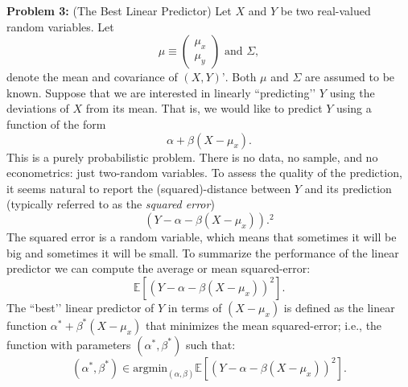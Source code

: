\documentclass[11pt]{article} %
\begin{document}
\noindent \textbf{Problem 3:} (The Best Linear Predictor) Let $X$ and $Y$ be two real-valued random variables. Let
\[\mu \equiv \begin{pmatrix} \mu_x \\ \mu_y \end{pmatrix} \textrm{ and } \Sigma, \]
denote the mean and covariance of $(X,Y)’$. Both $\mu$ and $\Sigma$ are assumed to be known. Suppose that we are interested in linearly ``predicting’’ $Y$ using the deviations of $X$ from its mean. That is, we would like to predict $Y$ using a function of the form
\[ \alpha + \beta (X-\mu_x). \]
This is a purely probabilistic problem. There is no data, no sample, and no econometrics: just two-random variables. To assess the quality of the prediction, it seems natural to report the (squared)-distance between $Y$ and its prediction (typically referred to as the \emph{squared error})
\[ (Y - \alpha -\beta (X-\mu_x)).^2 \]
The squared error is a random variable, which means that sometimes it will be big and sometimes it will be small. To summarize the performance of the linear predictor we can compute the average or mean squared-error:
\[ \mathbb{E}[(Y - \alpha -\beta (X-\mu_x))^2]. \]   
The ``best’’ linear predictor of $Y$ in terms of $(X-\mu_x)$ is defined as the linear function $\alpha^* + \beta^* (X-\mu_x)$ that minimizes the mean squared-error; i.e., the function with parameters $(\alpha^*,\beta^*)$ such that:
\[ (\alpha^*,\beta^*) \in \textrm{argmin}_{(\alpha,\beta)} \mathbb{E}[(Y-\alpha-\beta (X-\mu_x))^2].  \]
\end{document}
